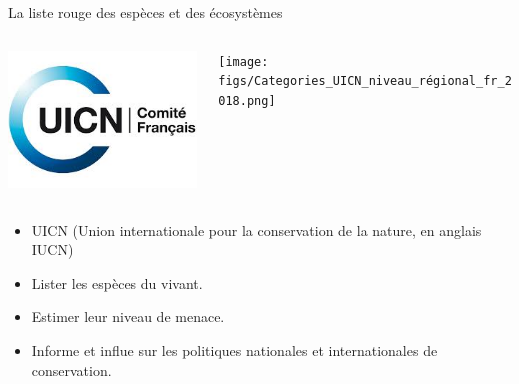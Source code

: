 \documentclass[10pt,table,dvipsnames,compress]{beamer}
\begin{document}
\begin{frame}[label={sec:org45985b2}]{La liste rouge des espèces et des écosystèmes}
\begin{columns}
\begin{column}{0.5\columnwidth}
\begin{center}
\includegraphics[width=\textwidth]{figs/iucn-logo.jpg}
\end{center}
\end{column}
\begin{column}{0.5\columnwidth}
\begin{center}
\texttt{[image: figs/Categories\_UICN\_niveau\_régional\_fr\_2018.png]}
\end{center}
\end{column}
\end{columns}
\begin{itemize}
\item UICN (Union internationale pour la conservation de la nature, en anglais IUCN)
\item Lister les espèces du vivant.
\item Estimer leur niveau de menace.
\item Informe et influe sur les politiques nationales et internationales de conservation.
\end{itemize}
\end{frame}
\end{document}
